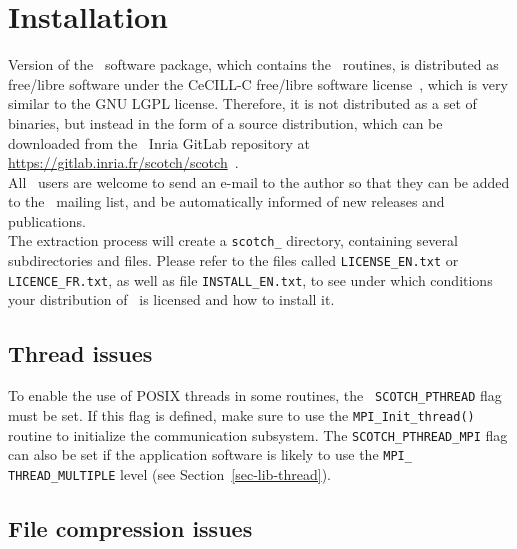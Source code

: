 
\section{Installation}
\label{sec-install}

Version {\sc \scotchver} of the \scotch\ software package, which
contains the \ptscotch\ routines, is distributed as free/libre
software under the CeCILL-C free/libre software license~\cite{cecill},
which is very similar to the GNU LGPL license. Therefore, it is not
distributed as a set of binaries, but instead in the form of a source
distribution, which can be downloaded from the \scotch\ Inria GitLab
repository at \url{https://gitlab.inria.fr/scotch/scotch}~.
\\

All \scotch\ users are welcome to send an e-mail to the author so that
they can be added to the \scotch\ mailing list, and be automatically
informed of new releases and publications.
\\

The extraction process will create a {\tt scotch\_\scotchversub}
directory, containing several subdirectories and files. Please refer
to the files called {\tt LICENSE\_\lbt EN.txt} or
{\tt LICENCE\_\lbt FR.txt}, as well as file
{\tt INSTALL\_\lbt EN.txt}, to see under which conditions your
distribution of \scotch\ is licensed and how to install it.

\subsection{Thread issues}

To enable the use of POSIX threads in some routines, the {\tt
SCOTCH\_\lbt PTHREAD} flag must be set. If this flag is defined,
make sure to use the \texttt{MPI\_\lbt Init\_\lbt thread()}
routine to initialize the communication subsystem. The
{\tt SCOTCH\_\lbt PTHREAD\_\lbt MPI} flag can also be set if the
application software is likely to use the \texttt{MPI\_\lbt
THREAD\_\lbt MULTIPLE} level (see Section~\ref{sec-lib-thread}).

\subsection{File compression issues}

